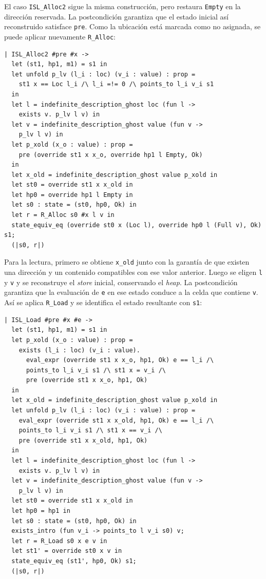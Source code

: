 \documentclass[a4paper,	11pt]{report}
\begin{document}
El caso \lstinline|ISL_Alloc2| sigue la misma construcción,
pero restaura \lstinline|Empty| en la dirección reservada.
La postcondición garantiza que el estado inicial así reconstruido satisface \lstinline|pre|.
Como la ubicación está marcada como no asignada,
se puede aplicar nuevamente \lstinline|R_Alloc|:

\begin{lstlisting}
| ISL_Alloc2 #pre #x ->
  let (st1, hp1, m1) = s1 in
  let unfold p_lv (l_i : loc) (v_i : value) : prop =
    st1 x == Loc l_i /\ l_i =!= 0 /\ points_to l_i v_i s1
  in
  let l = indefinite_description_ghost loc (fun l ->
    exists v. p_lv l v) in
  let v = indefinite_description_ghost value (fun v ->
    p_lv l v) in
  let p_xold (x_o : value) : prop =
    pre (override st1 x x_o, override hp1 l Empty, Ok)
  in
  let x_old = indefinite_description_ghost value p_xold in
  let st0 = override st1 x x_old in
  let hp0 = override hp1 l Empty in
  let s0 : state = (st0, hp0, Ok) in
  let r = R_Alloc s0 #x l v in
  state_equiv_eq (override st0 x (Loc l), override hp0 l (Full v), Ok) s1;
  (|s0, r|)
\end{lstlisting}

Para la lectura,
primero se obtiene \lstinline|x_old| junto con la garantía de que existen una dirección y un contenido compatibles con ese valor anterior.
Luego se eligen \lstinline|l| y \lstinline|v| y se reconstruye el \emph{store} inicial,
conservando el \emph{heap}.
La postcondición garantiza que la evaluación de \lstinline|e| en ese estado conduce a la celda que contiene \lstinline|v|.
Así se aplica \lstinline|R_Load| y se identifica el estado resultante con \lstinline|s1|:

\begin{lstlisting}
| ISL_Load #pre #x #e ->
  let (st1, hp1, m1) = s1 in
  let p_xold (x_o : value) : prop =
    exists (l_i : loc) (v_i : value).
      eval_expr (override st1 x x_o, hp1, Ok) e == l_i /\
      points_to l_i v_i s1 /\ st1 x = v_i /\
      pre (override st1 x x_o, hp1, Ok)
  in
  let x_old = indefinite_description_ghost value p_xold in
  let unfold p_lv (l_i : loc) (v_i : value) : prop =
    eval_expr (override st1 x x_old, hp1, Ok) e == l_i /\ 
    points_to l_i v_i s1 /\ st1 x == v_i /\
    pre (override st1 x x_old, hp1, Ok)
  in
  let l = indefinite_description_ghost loc (fun l ->
    exists v. p_lv l v) in
  let v = indefinite_description_ghost value (fun v ->
    p_lv l v) in
  let st0 = override st1 x x_old in
  let hp0 = hp1 in
  let s0 : state = (st0, hp0, Ok) in
  exists_intro (fun v_i -> points_to l v_i s0) v;
  let r = R_Load s0 x e v in
  let st1' = override st0 x v in
  state_equiv_eq (st1', hp0, Ok) s1;
  (|s0, r|)
\end{lstlisting}
\end{document}
